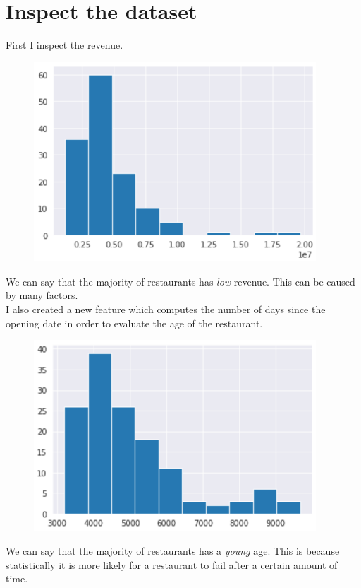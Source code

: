 \documentclass[a4paper,10pt]{report}
\begin{document}
\section{Inspect the dataset}
First I inspect the revenue.
\begin{figure}[H]
    \centering
    \includegraphics[width = 300pt]{img/revenue.png}
  \end{figure} 
We can say that the majority of restaurants has \emph{low} revenue. This can be caused by many factors.\\
I also created a new feature which computes the number of days since the opening date in order to evaluate the age of the restaurant.\\
\begin{figure}[H]
    \centering
    \includegraphics[width = 300pt]{img/opendate.png}
  \end{figure} 
We can say that the majority of restaurants has a \emph{young} age. This is because statistically it is more likely for a restaurant to fail after a certain amount of time.
\end{document}
